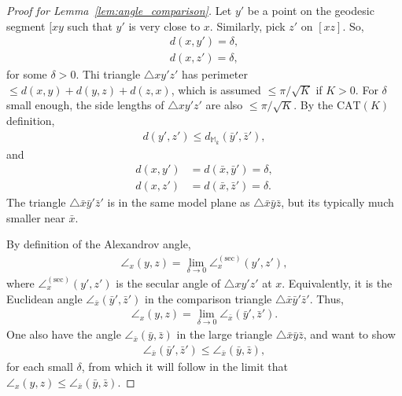 \begin{proof}[Proof for Lemma~\ref{lem:angle_comparison}]
    Let $y'$ be a point on the geodesic segment $[xy$ such that $y'$ is very close to $x$.
    Similarly, pick $z'$ on $[xz]$.
    So,
    \begin{align*}
        d(x, y') = \delta, \\
        d(x, z') = \delta,
    \end{align*}
    for some $\delta > 0$.
    Thi triangle $\triangle xy'z'$ has perimeter $\leq d(x, y) + d(y, z) + d(z, x)$, which is assumed $\leq \pi / \sqrt{K}$ if $K > 0$.
    For $\delta$ small enough, the side lengths of $\triangle xy'z'$ are also $\leq \pi / \sqrt{K}$.
    By the $\mathrm{CAT}(K)$ definition,
    \begin{align*}
        d(y', z') \leq d_{\mathbb{M}_k}(\bar{y}', \bar{z}'),
    \end{align*}
    and
    \begin{align*}
        d(x, y') &= d(\bar{x}, \bar{y}') = \delta, \\
        d(x, z') &= d(\bar{x}, \bar{z}') = \delta.
    \end{align*}
    The triangle $\triangle \bar{x} \bar{y}' \bar{z}'$ is in the same model plane as $\triangle \bar{x}\bar{y}\bar{z}$, but its typically much smaller near $\bar{x}$.

    By definition of the Alexandrov angle,
    \begin{align*}
        \angle_x(y, z) = \lim_{\delta \to 0} \angle_x^{(\mathrm{sec})}(y', z'),
    \end{align*}
    where $\angle_x^{(\mathrm{sec})}(y', z')$ is the secular angle of $\triangle xy'z'$ at $x$.
    Equivalently, it is the Euclidean angle $\angle_{\bar{x}}(\bar{y}', \bar{z}')$ in the comparison triangle $\triangle\bar{x}\bar{y}'\bar{z}'$.
    Thus,
    \begin{align*}
        \angle_x(y, z) = \lim_{\delta \to 0}\angle_{\bar{x}}(\bar{y}', \bar{z}').
    \end{align*}
    One also have the angle $\angle_{\bar{x}}(\bar{y}, \bar{z})$ in the large triangle $\triangle \bar{x}\bar{y}\bar{z}$, and want to show
    \begin{align*}
        \angle_{\bar{x}}(\bar{y}', \bar{z}') \leq \angle_{\bar{x}}(\bar{y}, \bar{z}),
    \end{align*}
    for each small $\delta$, from which it will follow in the limit that $\angle_x(y, z) \leq \angle_{\bar{x}}(\bar{y}, \bar{z})$.


\end{proof}
